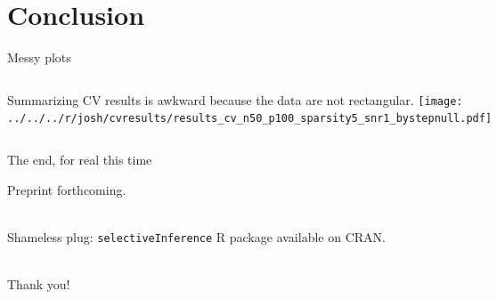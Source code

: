 \documentclass{beamer}
\begin{document}
\section{Conclusion}
\label{sec:future}









  

\begin{frame}{Messy plots}

    \begin{columns}[c]
      Summarizing CV results is awkward because the data are not rectangular.
      \texttt{[image: ../../../r/josh/cvresults/results\_cv\_n50\_p100\_sparsity5\_snr1\_bystepnull.pdf]}  
    \end{columns}
    
  
\end{frame}

\begin{frame}{The end, for real this time}
  
  Preprint forthcoming. \\

\ 

  Shameless plug: \texttt{selectiveInference} R package available on
  CRAN. \\

\ 

\centering
  {\Huge Thank you! \\ \ \\ \ \\ \ }


\end{frame}
\end{document}
